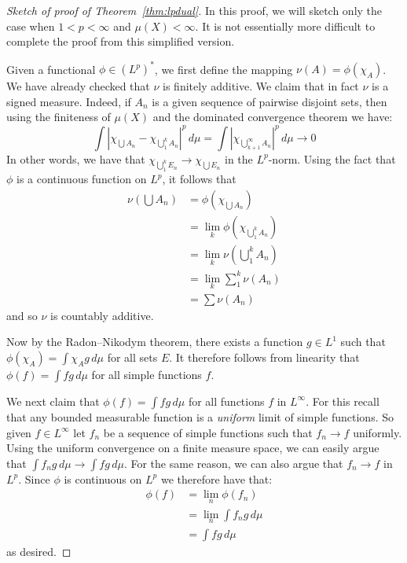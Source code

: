 \documentclass[11pt,oneside]{amsbook}
\theoremstyle{definition}
\theoremstyle{plain}
\theoremstyle{definition}
\theoremstyle{remark}
\numberwithin{equation}{section}
\numberwithin{figure}{section}
\begin{document}
\begin{proof}[Sketch of proof of Theorem~\ref{thm:lpdual}]
  In this proof, we will sketch only the case when $1<p<\infty$ and $\mu(X)<\infty$. It is not essentially more difficult to complete the proof from this simplified version.

  Given a functional $\phi\in(L^p)^*$, we first define the mapping $\nu(A)=\phi(\chi_A)$. We have already checked that $\nu$ is finitely additive. We claim that in fact $\nu$ is a signed measure. Indeed, if $A_n$ is a given sequence of pairwise disjoint sets, then using the finiteness of $\mu(X)$ and the dominated convergence theorem we have:
  \[\int|\chi_{\bigcup A_n}-\chi_{\bigcup_1^kA_n}|^p\,d\mu
    =\int|\chi_{\bigcup_{k+1}^\infty A_n}|^p\,d\mu
    \to0
  \]
  In other words, we have that $\chi_{\bigcup_1^kE_n}\to\chi_{\bigcup E_n}$ in the $L^p$-norm. Using the fact that $\phi$ is a continuous function on $L^p$, it follows that
  \begin{align*}
    \nu(\bigcup A_n)&=\phi(\chi_{\bigcup A_n})\\
                    &=\lim_k\phi(\chi_{\bigcup_1^k A_n})\\
                    &=\lim_k\nu(\bigcup_1^k A_n)\\
                    &=\lim_k\sum_1^k\nu(A_n)\\
                    &=\sum\nu(A_n)
  \end{align*}
  and so $\nu$ is countably additive.

  Now by the Radon--Nikodym theorem, there exists a function $g\in L^1$ such that $\phi(\chi_A)=\int\chi_A g\,d\mu$ for all sets $E$. It therefore follows from linearity that $\phi(f)=\int fg\,d\mu$ for all simple functions $f$.

  We next claim that $\phi(f)=\int fg\,d\mu$ for all functions $f$ in $L^\infty$. For this recall that any bounded measurable function is a \emph{uniform} limit of simple functions. So given $f\in L^\infty$ let $f_n$ be a sequence of simple functions such that $f_n\to f$ uniformly. Using the uniform convergence on a finite measure space, we can easily argue that $\int f_ng\,d\mu\to\int fg\,d\mu$. For the same reason, we can also argue that $f_n\to f$ in $L^p$. Since $\phi$ is continuous on $L^p$ we therefore have that:
  \begin{align*}
    \phi(f)&=\lim_n\phi(f_n)\\
           &=\lim_n\int f_ng\,d\mu\\
           &=\int fg\,d\mu
  \end{align*}
  as desired.


\end{proof}
\end{document}
